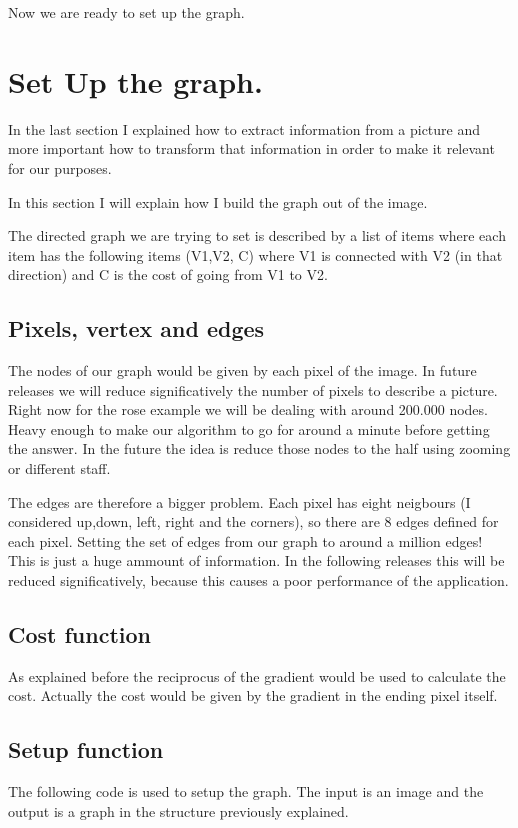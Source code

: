 \documentclass[letterpaper,10pt,english]{sphinxmanual}
\begin{document}
Now we are ready to set up the graph.


\chapter{Set Up the graph.}
\label{setup:setup}\label{setup:set-up-the-graph}\label{setup::doc}
In the last section I explained how to extract information from a picture and more important how to transform that information in order to make it relevant for our purposes.

In this section I will explain how I build the graph out of the image.

The directed graph we are trying to set is described by a list of items where each item has the following items (V1,V2, C) where V1 is connected with V2 (in that direction) and C is the cost of going from V1 to V2.


\section{Pixels, vertex and edges}
\label{setup:pixels-vertex-and-edges}
The nodes of our graph would be given by each pixel of the image. In future releases we will reduce significatively the number of pixels to describe a picture. Right now for the rose example we will be dealing with around 200.000 nodes. Heavy enough to make our algorithm to go for around a minute before getting the answer. In the future the idea is reduce those nodes to the half using zooming or different staff.

The edges are therefore a bigger problem. Each pixel has eight neigbours (I considered up,down, left, right and the corners), so there are 8 edges defined for each pixel. Setting the set of edges from our graph to around a million edges! This is just a huge ammount of information. In the following releases this will be  reduced significatively, because this causes a poor performance of the application.


\section{Cost function}
\label{setup:cost-function}
As explained before the reciprocus of the gradient would be used to calculate the cost. Actually the cost would be given by the gradient in the ending pixel itself.


\section{Setup function}
\label{setup:setup-function}
The following code is used to setup the graph. The input is an image and the output is a graph in the structure previously explained.
\end{document}
